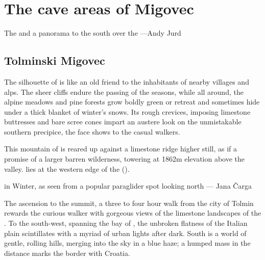 \chapter{The cave areas of Migovec}
\begin{marginfigure}
\checkoddpage \ifoddpage \forcerectofloat \else \forceversofloat \fi
\centering
 \caption{The \protect{} and a panorama to the south over the \protect{} ---Andy Jurd}
 \label{dinarides}
\end{marginfigure}

\section{Tolminski Migovec}
The silhouette of  is like an old friend to the inhabitants of nearby villages and alps. The sheer cliffs endure the passing of the seasons, while all around, the alpine meadows and pine forests grow boldly green or retreat and sometimes hide under a thick blanket of winter's snows. Its rough crevices, imposing limestone buttresses and bare scree cones impart an austere look on the unmistakable southern precipice, the face  shows to the casual walkers.

This mountain of  is reared up against a limestone ridge higher still, as if a promise of a larger barren wilderness, towering at 1862m elevation above the valley.  lies at the western edge of the  (). 


 \begin{pagefigure}
 \checkoddpage \ifoddpage \forcerectofloat \else \forceversofloat \fi
\centering
  \label{winter panorama migovec}
  \caption{\protect{} in Winter, as seen from a popular paraglider spot looking north --- Jana Čarga}
 \end{pagefigure}

The ascension to the summit, a three to four hour walk from the city of Tolmin rewards the curious walker with gorgeous views of the limestone landscapes of the . To the south-west, spanning the bay of , the unbroken flatness of the Italian plain scintillates with a myriad of urban lights after dark. South is a world of gentle, rolling hills, merging into the sky in a blue haze; a humped mass in the distance marks the border with Croatia. 


